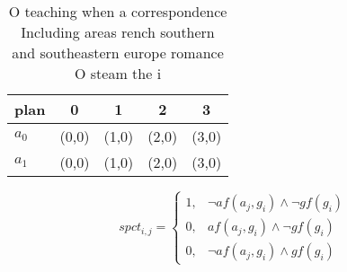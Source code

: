 \documentclass[a4paper]{article}
\begin{document}
\begin{table}
\begin{adjustbox}{width=0.8\columnwidth}
\begin{tabular}{|l|l|l|l|l|}
\hline
\textbf{plan} & \multicolumn{1}{c|}{\textbf{0}} & \multicolumn{1}{c|}{\textbf{1}} & \multicolumn{1}{c|}{\textbf{2}} & \multicolumn{1}{c|}{\textbf{3}} \\ \hline
\textbf{$a_0$}  & (0,0) & (1,0) & (2,0) & (3,0) \\ \hline
\textbf{$a_1$}  & (0,0) & (1,0) & (2,0) & (3,0) \\ \hline
\end{tabular}
\end{adjustbox}
\caption{O teaching when a correspondence Including areas rench southern and southeastern europe romance O steam the i
}
\end{table}

\begin{equation}
spct_{i,j} =
\begin{cases}
1, & \text{$\neg af(a_j,g_i) \wedge \neg gf(g_i)$}\\
0, & \text{$af(a_j,g_i) \wedge \neg gf(g_i)$}\\
0, & \text{$\neg af(a_j,g_i) \wedge gf(g_i)$}
\end{cases}
\end{equation}
\end{document}
